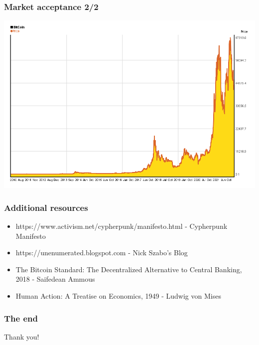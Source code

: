 \documentclass{beamer}
\begin{document}
\begin{frame}[fragile]
  \frametitle{Market acceptance 2/2}
  \includegraphics[width=\textwidth]{bitcoin-price}
\end{frame}

\begin{frame}
  \frametitle{Additional resources}
  \begin{itemize}
  \item https://www.activism.net/cypherpunk/manifesto.html - Cypherpunk Manifesto
  \item https://unenumerated.blogspot.com - Nick Szabo's Blog
  \item The Bitcoin Standard: The Decentralized Alternative to Central Banking,
    2018 - Saifedean Ammous
  \item Human Action: A Treatise on Economics, 1949 - Ludwig von Mises
  \end{itemize}
\end{frame}

\begin{frame}
  \frametitle{The end}
  \begin{center}
    Thank you!
  \end{center}
\end{frame}
\end{document}
